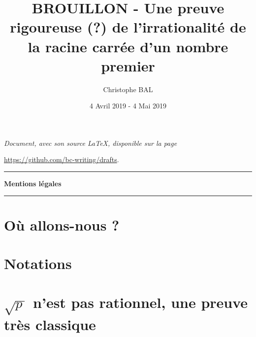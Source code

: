 \documentclass[12pt]{amsart}
\begin{document}
\title{BROUILLON - Une preuve rigoureuse (\!?) de l'irrationalité de la racine carrée d'un nombre premier}
\author{Christophe BAL}
\date{4 Avril 2019 - 4 Mai 2019}

\maketitle

\begin{center}
	\itshape
	Document, avec son source \LaTeX, disponible sur la page

	\url{https://github.com/bc-writing/drafts}.
\end{center}


\bigskip


\begin{center}
	\hrule\vspace{.3em}
	{
		\fontsize{1.35em}{1em}\selectfont
		\textbf{Mentions \og légales \fg}
	}

	\vspace{0.45em}
	\doclicenseThis
	\hrule
\end{center}


\bigskip
\setcounter{tocdepth}{2}
\tableofcontents




\section{Où allons-nous ?}






\section{Notations}






\section{\texorpdfstring{$\sqrt{p\,}$ n'est pas rationnel, une preuve très classique}%
		                {Racine carrée de p n'est pas rationnel, une preuve très classique}}


\end{document}
